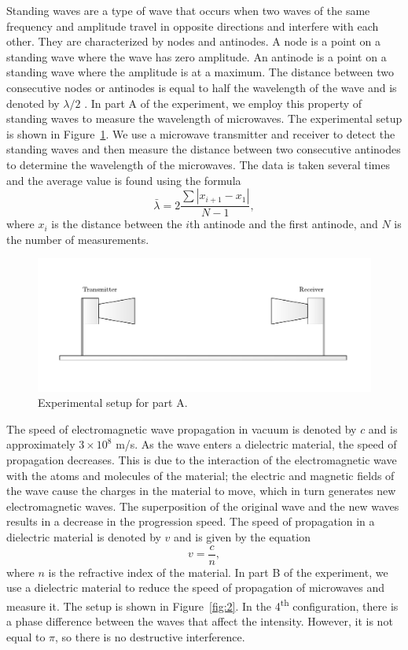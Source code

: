 \documentclass[10pt]{article}
\begin{document}
Standing waves are a type of wave that occurs when two waves of the same frequency and amplitude travel in opposite directions and interfere with each other. They are characterized by nodes and antinodes. A node is a point on a standing wave where the wave has zero amplitude. An antinode is a point on a standing wave where the amplitude is at a maximum. The distance between two consecutive nodes or antinodes is equal to half the wavelength of the wave and is denoted by $\lambda/2$ \cite{Sears_&_Zemansky_2013}. In part A of the experiment, we employ this property of standing waves to measure the wavelength of microwaves. The experimental setup is shown in Figure~\ref{fig:1}. We use a microwave transmitter and receiver to detect the standing waves and then measure the distance between two consecutive antinodes to determine the wavelength of the microwaves. The data is taken several times and the average value is found using the formula
\begin{equation}\label{eq:average-wavelength}
  \bar{\lambda} = 2 \frac{\sum\left|x_{i+1}-x_1\right|}{N-1},
\end{equation}
where $x_i$ is the distance between the $i$th antinode and the first antinode, and $N$ is the number of measurements.

\begin{figure}[ht]
  \centering
  \includegraphics[scale=0.4]{figures/f1.pdf}
  \caption{Experimental setup for part A.}
  \label{fig:1}
\end{figure}

The speed of electromagnetic wave propagation in vacuum is denoted by $c$ and is approximately $3 \times 10^8$ m/s. As the wave enters a dielectric material, the speed of propagation decreases. This is due to the interaction of the electromagnetic wave with the atoms and molecules of the material; the electric and magnetic fields of the wave cause the charges in the material to move, which in turn generates new electromagnetic waves. The superposition of the original wave and the new waves results in a decrease in the progression speed. The speed of propagation in a dielectric material is denoted by $v$ and is given by the equation
\begin{equation}
  v = \frac{c}{n},
\end{equation}
where $n$ is the refractive index of the material. In part B of the experiment, we use a dielectric material to reduce the speed of propagation of microwaves and measure it. The setup is shown in Figure~\ref{fig:2}. In the 4\textsuperscript{th} configuration, there is a phase difference between the waves that affect the intensity. However, it is not equal to $\pi$, so there is no destructive interference. 
\end{document}
